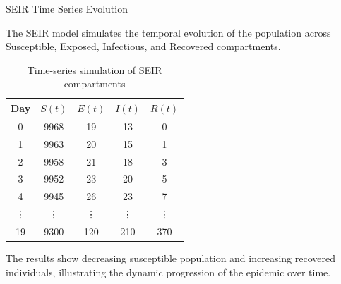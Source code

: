 \documentclass{beamer}
\begin{document}
\begin{frame}{SEIR Time Series Evolution}

The SEIR model simulates the temporal evolution of the population
across Susceptible, Exposed, Infectious, and Recovered compartments.

\begin{table}
\centering
\scriptsize
\begin{tabular}{|c|c|c|c|c|}
\hline
Day & $S(t)$ & $E(t)$ & $I(t)$ & $R(t)$ \\
\hline
0 & 9968&19	&13	&0 \\
1&9963&20&15&1 \\
2&9958&21&18&3 \\
3&9952&23&20&5 \\
4&9945&26&23&7 \\
\vdots & \vdots & \vdots & \vdots & \vdots \\
19 & 9300 & 120 & 210 & 370 \\
\hline
\end{tabular}
\caption{Time-series simulation of SEIR compartments}
\end{table}

\vspace{0.2cm}
\small
The results show decreasing susceptible population and increasing recovered individuals,
illustrating the dynamic progression of the epidemic over time.

\end{frame}
\end{document}
